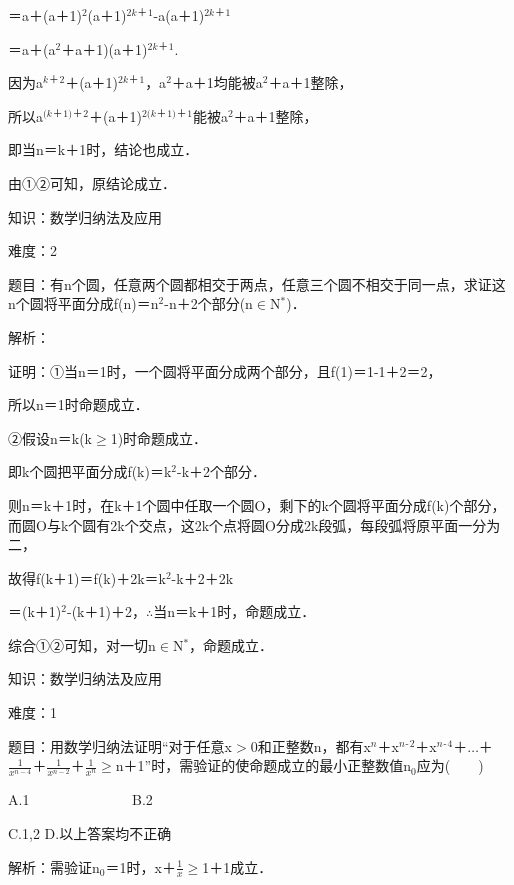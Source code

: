 \documentclass{article} %
\begin{document}
＝a＋(a＋1)${}^{2}$(a＋1)${}^{2k}$${}^{\textrm{＋}}$${}^{1}$-a(a＋1)${}^{2k}$${}^{\textrm{＋}}$${}^{1}$

＝a＋(a${}^{2}$＋a＋1)(a＋1)${}^{2k}$${}^{\textrm{＋}}$${}^{1}$.

因为a${}^{k}$${}^{\textrm{＋}}$${}^{2}$＋(a＋1)${}^{2k}$${}^{\textrm{＋}}$${}^{1}$，a${}^{2}$＋a＋1均能被a${}^{2}$＋a＋1整除，

所以a${}^{(k}$${}^{\textrm{＋}}$${}^{1)}$${}^{\textrm{＋}}$${}^{2}$＋(a＋1)${}^{2(k}$${}^{\textrm{＋}}$${}^{1)}$${}^{\textrm{＋}}$${}^{1}$能被a${}^{2}$＋a＋1整除，

即当n＝k＋1时，结论也成立．

由①②可知，原结论成立．



 知识：数学归纳法及应用

 难度：2

 题目：有n个圆，任意两个圆都相交于两点，任意三个圆不相交于同一点，求证这n个圆将平面分成f(n)＝n${}^{2}$-n＋2个部分(n$\mathrm{\in}$N${}^{*}$)．

 解析：

 证明：①当n＝1时，一个圆将平面分成两个部分，且f(1)＝1-1＋2＝2，

所以n＝1时命题成立．

②假设n＝k(k$\mathrm{\ge}$1)时命题成立．

即k个圆把平面分成f(k)＝k${}^{2}$-k＋2个部分．

则n＝k＋1时，在k＋1个圆中任取一个圆O，剩下的k个圆将平面分成f(k)个部分，而圆O与k个圆有2k个交点，这2k个点将圆O分成2k段弧，每段弧将原平面一分为二，

故得f(k＋1)＝f(k)＋2k＝k${}^{2}$-k＋2＋2k

＝(k＋1)${}^{2}$-(k＋1)＋2，$\mathrm{\therefore}$当n＝k＋1时，命题成立．

综合①②可知，对一切n$\mathrm{\in}$N${}^{*}$，命题成立．

 

 知识：数学归纳法及应用

 难度：1

 题目：用数学归纳法证明``对于任意x$\mathrm{>}$0和正整数n，都有x${}^{n}$＋x${}^{n}$${}^{\textrm{-}}$${}^{2}$＋x${}^{n}$${}^{\textrm{-}}$${}^{4}$＋{$\dots$}＋$\frac{1}{x^{n-4}}$＋$\frac{1}{x^{n-2}}$＋$\frac{1}{x^n}$$\mathrm{\ge}$n＋1''时，需验证的使命题成立的最小正整数值n${}_{0}$应为(　　)

A.1　　　　　　　  B.2

C.1,2  D.以上答案均不正确

 解析：需验证n${}_{0}$＝1时，x＋$\frac{1}{x}\mathrm{\ge}$1＋1成立．
\end{document}
